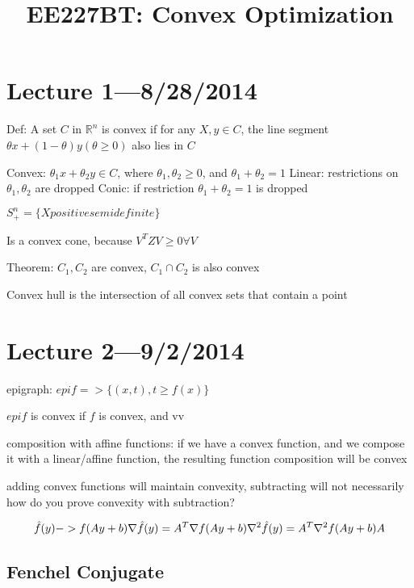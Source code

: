 \documentclass[10pt]{article}
\begin{document}
\title{EE227BT: Convex Optimization}

\maketitle

\section{Lecture 1---8/28/2014}

Def: A set $C$ in $\mathbb{R}^n$ is convex if for any $X,y \in C$, the line segment $\theta x + (1 - \theta) y (\theta \ge 0)$ also lies in $C$

Convex: $\theta_1 x + \theta_2 y \in C$, where $\theta_1, \theta_2 \ge 0$, and $\theta_1 + \theta_2 = 1$
Linear: restrictions on $\theta_1, \theta_2$ are dropped
Conic: if restriction $\theta_1 + \theta_2 = 1$ is dropped

$S^n_+ = \{ X positive semidefinite \}$

Is a convex cone, because $V^T Z V \ge 0 \forall V$

Theorem: $C_1, C_2$ are convex, $C_1 \cap C_2$ is also convex

Convex hull is the intersection of all convex sets that contain a point

\section{Lecture 2---9/2/2014}

epigraph: $epi f => \{(x, t), t \ge f(x) \}$

$epi f$ is convex if $f$ is convex, and vv

composition with affine functions: if we have a convex function, and we compose it with a linear/affine function, the resulting function composition will be convex

adding convex functions will maintain convexity, subtracting will not necessarily
how do you prove convexity with subtraction?

$$
\hat{f}(y) -> f(Ay + b) \\
\nabla \hat{f}(y) = A^T \nabla f(Ay + b) \\
\nabla^2 \hat{f}(y) = A^T \nabla^2 f(Ay + b) A
$$

\subsection{Fenchel Conjugate}
\end{document}
